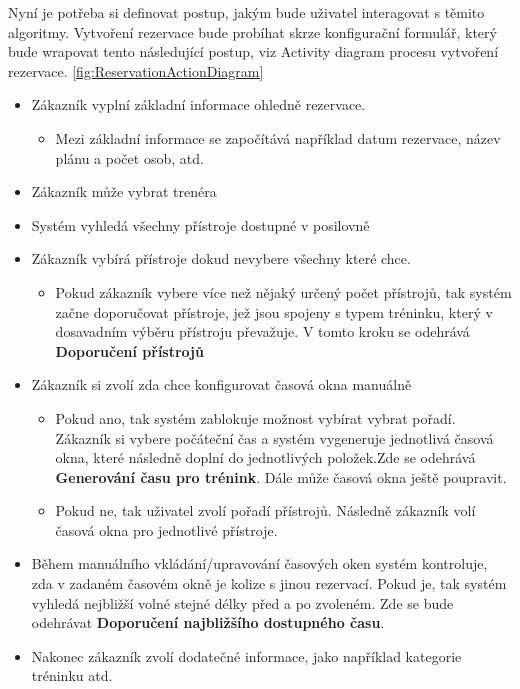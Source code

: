 Nyní je potřeba si definovat postup, jakým bude uživatel interagovat s těmito algoritmy. Vytvoření rezervace bude probíhat skrze konfigurační formulář, který bude wrapovat tento následující postup, viz Activity diagram procesu vytvoření rezervace. \ref{fig:ReservationActionDiagram}
\begin{itemize}
  \item Zákazník vyplní základní informace ohledně rezervace.
    \begin{itemize}
      \item Mezi základní informace se započítává například datum rezervace, název plánu a počet osob, atd.
    \end{itemize}
  \item Zákazník může vybrat trenéra
  \item Systém vyhledá všechny přístroje dostupné v posilovně
  \item Zákazník vybírá přístroje dokud nevybere všechny které chce.
    \begin{itemize}
        \item Pokud zákazník vybere více než nějaký určený počet přístrojů, tak systém začne doporučovat přístroje, jež jsou spojeny s typem tréninku, který v dosavadním výběru přístroju převažuje. V tomto kroku se odehrává \textbf{Doporučení přístrojů}
    \end{itemize}
  \item Zákazník si zvolí zda chce konfigurovat časová okna manuálně
      \begin{itemize}
        \item Pokud ano, tak systém zablokuje možnost vybírat vybrat pořadí. Zákazník si vybere počáteční čas a systém vygeneruje jednotlivá časová okna, které následně doplní do jednotlivých položek.Zde se odehrává \textbf{Generování času pro trénink}. Dále může časová okna ještě poupravit. 
        \item Pokud ne, tak uživatel zvolí pořadí přístrojů. Následně zákazník volí časová okna pro jednotlivé přístroje. 
    \end{itemize}
    
  \item Během manuálního vkládání/upravování časových oken systém kontroluje, zda v zadaném časovém okně je kolize s jinou rezervací. Pokud je, tak systém vyhledá nejbližší volné stejné délky před a po zvoleném. Zde se bude odehrávat \textbf{Doporučení najbližšího dostupného času}.
  \item Nakonec zákazník zvolí dodatečné informace, jako například kategorie tréninku atd.
\end{itemize}

